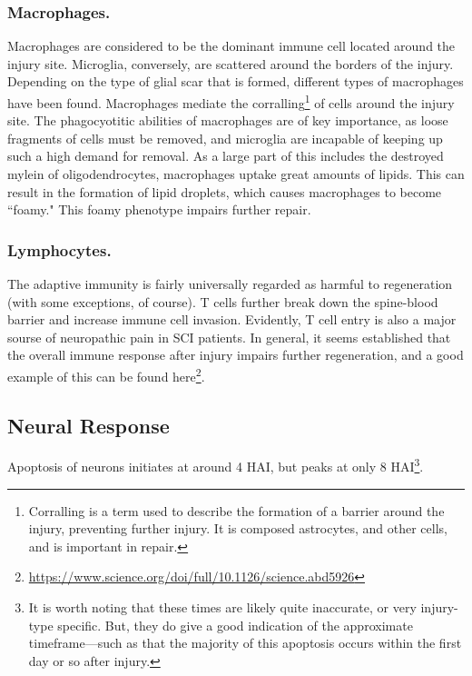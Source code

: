 \documentclass[12pt]{report}
\begin{document}
\subsubsection{Macrophages.}
Macrophages are considered to be the dominant immune cell located around the injury site. Microglia, conversely, are scattered around the borders of the injury. Depending on the type of glial scar that is formed, different types of macrophages have been found. Macrophages mediate the corralling\footnote{Corralling is a term used to describe the formation of a barrier around the injury, preventing further injury. It is composed astrocytes, and other cells, and is important in repair.} of cells around the injury site. The phagocyotitic abilities of macrophages are of key importance, as loose fragments of cells must be removed, and microglia are incapable of keeping up such a high demand for removal. As a large part of this includes the destroyed mylein of oligodendrocytes, macrophages uptake great amounts of lipids. This can result in the formation of lipid droplets, which causes macrophages to become ``foamy." This foamy phenotype impairs further repair. 

\subsubsection{Lymphocytes.} 
The adaptive immunity is fairly universally regarded as harmful to regeneration (with some exceptions, of course). T cells further break down the spine-blood barrier and increase immune cell invasion. Evidently, T cell entry is also a major sourse of neuropathic pain in SCI patients. In general, it seems established that the overall immune response after injury impairs further regeneration, and a good example of this can be found here\footnote{\url{https://www.science.org/doi/full/10.1126/science.abd5926}}. 

\subsection{Neural Response}

Apoptosis of neurons initiates at around 4 HAI, but peaks at only 8 HAI\footnote{It is worth noting that these times are likely quite inaccurate, or very injury-type specific. But, they do give a good indication of the approximate timeframe---such as that the majority of this apoptosis occurs within the first day or so after injury.}. 
\end{document}
